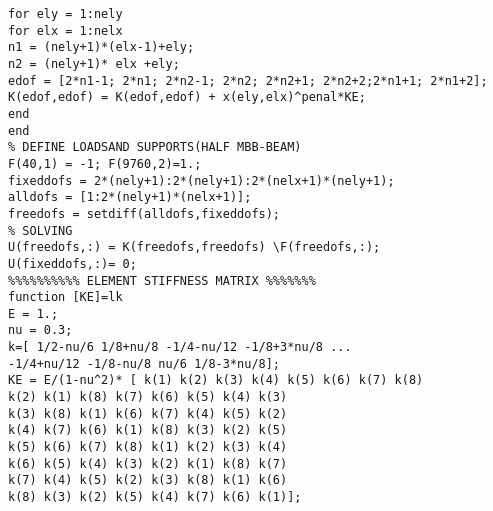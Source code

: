 \documentclass{article}
\begin{document}
\begin{verbatim}
for ely = 1:nely
for elx = 1:nelx
n1 = (nely+1)*(elx-1)+ely;
n2 = (nely+1)* elx +ely;
edof = [2*n1-1; 2*n1; 2*n2-1; 2*n2; 2*n2+1; 2*n2+2;2*n1+1; 2*n1+2];
K(edof,edof) = K(edof,edof) + x(ely,elx)^penal*KE;
end
end
% DEFINE LOADSAND SUPPORTS(HALF MBB-BEAM)
F(40,1) = -1; F(9760,2)=1.;
fixeddofs = 2*(nely+1):2*(nely+1):2*(nelx+1)*(nely+1);
alldofs = [1:2*(nely+1)*(nelx+1)];
freedofs = setdiff(alldofs,fixeddofs);
% SOLVING
U(freedofs,:) = K(freedofs,freedofs) \F(freedofs,:);
U(fixeddofs,:)= 0;
%%%%%%%%%% ELEMENT STIFFNESS MATRIX %%%%%%%
function [KE]=lk
E = 1.;
nu = 0.3;
k=[ 1/2-nu/6 1/8+nu/8 -1/4-nu/12 -1/8+3*nu/8 ...
-1/4+nu/12 -1/8-nu/8 nu/6 1/8-3*nu/8];
KE = E/(1-nu^2)* [ k(1) k(2) k(3) k(4) k(5) k(6) k(7) k(8)
k(2) k(1) k(8) k(7) k(6) k(5) k(4) k(3)
k(3) k(8) k(1) k(6) k(7) k(4) k(5) k(2)
k(4) k(7) k(6) k(1) k(8) k(3) k(2) k(5)
k(5) k(6) k(7) k(8) k(1) k(2) k(3) k(4)
k(6) k(5) k(4) k(3) k(2) k(1) k(8) k(7)
k(7) k(4) k(5) k(2) k(3) k(8) k(1) k(6)
k(8) k(3) k(2) k(5) k(4) k(7) k(6) k(1)];

\end{verbatim}

\newpage
\end{document}
